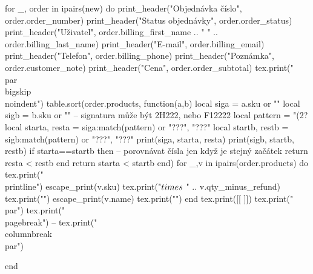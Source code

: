 \documentclass[landscape,a4page]{article}
\begin{document}
\begin{multicols*}{3}
\begin{luacode*}
for _, order in ipairs(new) do
  print_header("Objednávka číslo", order.order_number)
  print_header("Status objednávky", order.order_status)
  print_header("Uživatel", order.billing_first_name .. " " .. order.billing_last_name)
  print_header("E-mail", order.billing_email)
  print_header("Telefon", order.billing_phone)
  print_header("Poznámka", order.customer_note)
  print_header("Cena", order.order_subtotal)
  tex.print("\\par\\bigskip\\noindent")
  table.sort(order.products, function(a,b)
    local siga = a.sku or ""
    local sigb = b.sku or ""
    -- signatura může být 2H222, nebo F12222
    local pattern = "(2?%
    local starta, resta = siga:match(pattern) or "???", "???"
    local startb, restb = sigb:match(pattern) or "???", "???"
    print(siga, starta, resta)
    print(sigb, startb, restb)
    if starta==startb then
      -- porovnávat čísla jen když je stejný začátek
      return resta < restb 
    end
    return starta < startb
  end)
  for _,v in ipairs(order.products) do
    tex.print("\\printline{")
    escape_print(v.sku)
    tex.print("$\\times$ " .. v.qty_minus_refund)
    tex.print("}{")
    escape_print(v.name)
  tex.print("}")
  end
  tex.print([[
  \vfill
  \null
  ]])
  tex.print("\\par")
  tex.print("\\pagebreak")
  -- tex.print("\\columnbreak\\par")


end



\end{luacode*}
\end{multicols*}
\end{document}
